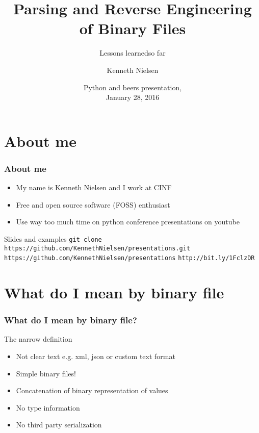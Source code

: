 \documentclass{beamer}
\title{Parsing and Reverse Engineering of Binary Files}
\subtitle{Lessons learned\newline{}\small{}so far}
\author{Kenneth Nielsen\inst{1}}
\institute
{
  \inst{1}%
  Center for Individual Nanoparticle Functionality (CINF)\\
  Institute of Physics\\
  Technical University of Denmark (DTU)
}
\date{
  Python and beers presentation,\\
  January 28, 2016}
\begin{document}
\frame{\titlepage}

\section{About me}

\begin{frame}
  \frametitle{About me}
  \begin{itemize}
    \item My name is Kenneth Nielsen and I work at CINF
    \item Free and open source software (FOSS) enthusiast
    \item Use way too much time on python conference presentations on
      youtube
  \end{itemize}
  \begin{block}{Slides and examples}
    \center
    \footnotesize
    \texttt{git clone https://github.com/KennethNielsen/presentations.git}\newline
    \newline
    \texttt{https://github.com/KennethNielsen/presentations}
    \texttt{http://bit.ly/1FclzDR}
  \end{block}
\end{frame}

\section{What do I mean by binary file}

\begin{frame}
  \frametitle{What do I mean by binary file?}
  \begin{block}{The narrow definition}
    \begin{itemize}
    \item Not clear text e.g. xml, json or custom text format
    \item Simple binary files!
    \item Concatenation of binary representation of values
    \item No type information
    \item No third party serialization
    \end{itemize}
  \end{block}
\end{frame}
\end{document}
